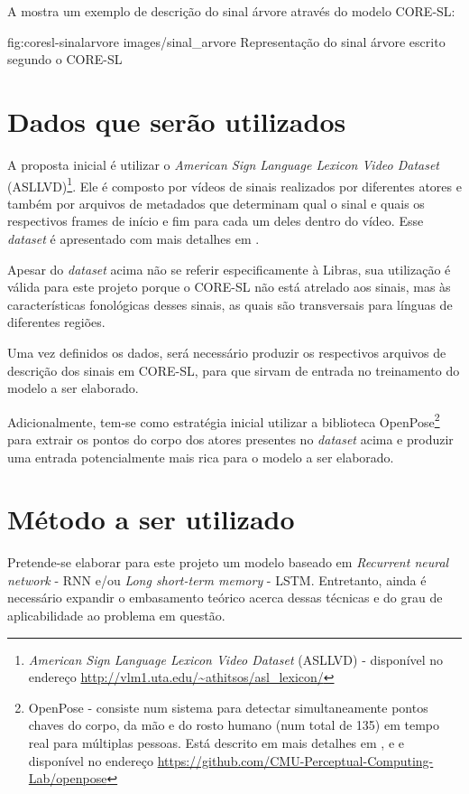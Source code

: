 A  mostra um exemplo de descrição do sinal árvore através do modelo CORE-SL:

\image
    {fig:coresl-sinalarvore}
    {images/sinal_arvore}
    {Representação do sinal árvore escrito segundo o CORE-SL}
    

\section{Dados que serão utilizados}
A proposta inicial é utilizar o \textit{American Sign Language Lexicon Video Dataset} (ASLLVD)\footnote{\textit{American Sign Language Lexicon Video Dataset} (ASLLVD) - disponível no endereço \url{http://vlm1.uta.edu/~athitsos/asl_lexicon/}}. Ele é composto por vídeos de sinais realizados por diferentes atores e também por arquivos de metadados que determinam qual o sinal e quais os respectivos frames de início e fim para cada um deles dentro do vídeo. Esse \textit{dataset} é apresentado com mais detalhes em \cite{athitsos-asldataset-2008}.

Apesar do \textit{dataset} acima não se referir especificamente à Libras, sua utilização é válida para este projeto porque o CORE-SL não está atrelado aos sinais, mas às características fonológicas desses sinais, as quais são transversais para línguas de diferentes regiões. 

Uma vez definidos os dados, será necessário produzir os respectivos arquivos de descrição dos sinais em CORE-SL, para que sirvam de entrada no treinamento do modelo a ser elaborado.

Adicionalmente, tem-se como estratégia inicial utilizar a biblioteca OpenPose\footnote{OpenPose - consiste num sistema para detectar simultaneamente pontos chaves do corpo, da mão e do rosto humano (num total de 135) em tempo real para múltiplas pessoas. Está descrito em mais detalhes em \textcite{cao-realtime-2017}, \textcite{simon-hand-2017} e \textcite{wei-cpm-2016} e disponível no endereço \url{https://github.com/CMU-Perceptual-Computing-Lab/openpose}} para extrair os pontos do corpo dos atores presentes no \textit{dataset} acima e produzir uma entrada potencialmente mais rica para o modelo a ser elaborado.

\section{Método a ser utilizado}
Pretende-se elaborar para este projeto um modelo baseado em \textit{Recurrent neural network} - RNN e/ou \textit{Long short-term memory} - LSTM. Entretanto, ainda é necessário expandir o embasamento teórico acerca dessas técnicas e do grau de aplicabilidade ao problema em questão.

